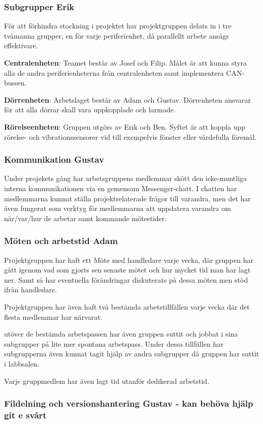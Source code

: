 \documentclass{article}
\begin{document}
\subsubsection{Subgrupper Erik}
För att förhindra stockning i projektet har projektgruppen delats in i tre tvåmanna grupper, en för varje periferienhet, då parallellt arbete ansågs effektivare.

\textbf{Centralenheten}: Teamet består av Josef och Filip. Målet är att kunna styra alla de andra periferienheterna från centralenheten samt implementera CAN-bussen.

\textbf{Dörrenheten}: Arbetslaget består av Adam och Gustav. Dörrenheten ansvarar för att alla dörrar skall vara uppkopplade och larmade.

\textbf{Rörelseenheten}: Gruppen utgörs av Erik och Ben. Syftet är att koppla upp rörelse- och vibrationssensorer vid till exempelvis fönster eller värdefulla föremål.

\subsubsection{Kommunikation Gustav}
Under projekets gång har arbetsgruppens medlemmar skött den icke-muntliga 
interna kommunikationen via en gemensam Messenger-chatt. 
I chatten har medlemmarna kunnat ställa projektrelaterade 
frågor till varandra, men det har även fungerat som verktyg
 för medlemmarna att uppdatera varandra om när/var/hur de 
 arbetar samt kommande mötestider.
\subsubsection{Möten och arbetstid Adam}
Projektgruppen har haft ett Möte med handledare varje vecka, där
gruppen har gått igenom vad som gjorts sen senaste mötet och hur
mycket tid man har lagt ner. Samt så har eventuella förändringar
diskuterats på dessa möten men stöd ifrån handledare.

Projektgruppen har även haft två bestämda arbetstillfällen varje
vecka där det flesta medlemmar har närvarat. 

utöver de bestämda arbetspassen har även gruppen suttit och 
jobbat i sina subgrupper på lite mer spontana arbetspass. Under
dessa tillfällen har subgrupperna även kunnat tagit hjälp av 
andra subgrupper då gruppen har suttit i labbsalen.

Varje gruppmedlem har även lagt tid utanför dedikerad arbetstid.  

\subsubsection{Fildelning och versionshantering Gustav - kan behöva hjälp git e svårt}
\end{document}

